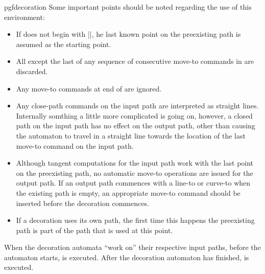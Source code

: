 \begin{environment}{{pgfdecoration}}
  Some important points should be noted regarding the use of this
  environment:
  
  \begin{itemize}
  \item
    If  does not begin with 
    |\pgfpathmoveto|,	he last known point on the preexisting path is 
    assumed as the starting point.
  \item
    All except the last of any sequence of consecutive move-to commands 
    in  are discarded.
  \item
    Any move-to commands at end of  are 
    ignored.
  \item
    Any close-path commands on the input path are interpreted as 
    straight lines.
    Internally somthing a little more complicated is going on,
    however, a closed path on the input path has no effect on the 
    output path, other than causing the automaton to travel in a 
    straight line towards the location of the last move-to command on 
    the input path.
  \item
    Although tangent computations for the input path work with the
    last point on the preexisting path, no automatic move-to
    operations are issued for the output path. 
    If an output path commences with a line-to or curve-to when the 
    existing path is empty, an appropriate move-to command should be 
    inserted before the decoration commences.
  \item
    If a decoration uses its own path, the first time this happens the
    preexisting path is part of the path that is used at this point.
  \end{itemize}

  When the decoration automata ``work on'' their respective input
  paths, before the automaton starts,  is
  executed. After the decoration automaton has finished,  is executed. 
        
\begin{codeexample}[]
\end{codeexample}


\end{environment}
